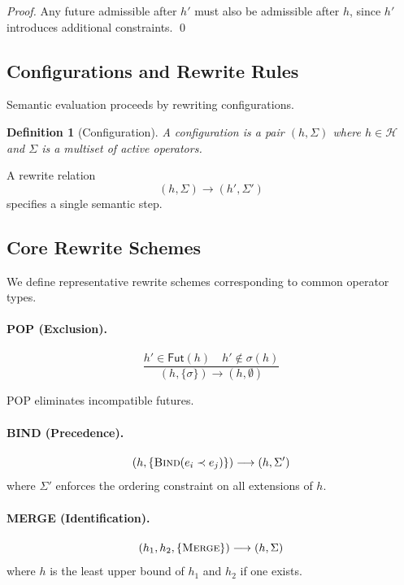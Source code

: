 \documentclass[11pt]{article}
\newtheorem{definition}{Definition}
\newcommand{\Hist}{\mathcal{H}}
\begin{document}
\begin{proof}
Any future admissible after $h'$ must also be admissible after $h$, since
$h'$ introduces additional constraints. \qed
\end{proof}

\subsection{Configurations and Rewrite Rules}

Semantic evaluation proceeds by rewriting configurations.

\begin{definition}[Configuration]
A configuration is a pair $(h, \Sigma)$ where $h \in \Hist$ and $\Sigma$ is a
multiset of active operators.
\end{definition}

A rewrite relation
\[
(h, \Sigma) \longrightarrow (h', \Sigma')
\]
specifies a single semantic step.

\subsection{Core Rewrite Schemes}

We define representative rewrite schemes corresponding to common operator types.

\paragraph{POP (Exclusion).}
\[
\frac{h' \in \mathsf{Fut}(h) \quad h' \notin \sigma(h)}
{(h, \{\sigma\}) \longrightarrow (h, \emptyset)}
\]

POP eliminates incompatible futures.

\paragraph{BIND (Precedence).}
\[
(h, \{\textsc{Bind}(e_i \prec e_j)\}) \longrightarrow (h, \Sigma')
\]
where $\Sigma'$ enforces the ordering constraint on all extensions of $h$.

\paragraph{MERGE (Identification).}
\[
(h_1, h_2, \{\textsc{Merge}\}) \longrightarrow (h, \Sigma)
\]
where $h$ is the least upper bound of $h_1$ and $h_2$ if one exists.
\end{document}
